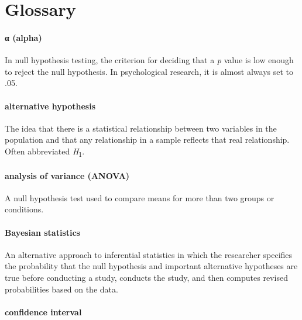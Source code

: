 \documentclass[
]{krantz}
\begin{document}
\hypertarget{glossary-13}{%
\section{Glossary}\label{glossary-13}}

\hypertarget{ux3b1-alpha}{%
\paragraph*{α (alpha)}\label{ux3b1-alpha}}

In null hypothesis testing, the criterion for deciding that a \emph{p} value is low enough to reject the null hypothesis. In psychological research, it is almost always set to .05.

\hypertarget{alternative-hypothesis}{%
\paragraph*{alternative hypothesis}\label{alternative-hypothesis}}

The idea that there is a statistical relationship between two variables in the population and that any relationship in a sample reflects that real relationship. Often abbreviated \emph{H}\textsubscript{1}.

\hypertarget{analysis-of-variance-anova}{%
\paragraph*{analysis of variance (ANOVA)}\label{analysis-of-variance-anova}}

A null hypothesis test used to compare means for more than two groups or conditions.

\hypertarget{bayesian-statistics}{%
\paragraph*{Bayesian statistics}\label{bayesian-statistics}}

An alternative approach to inferential statistics in which the researcher specifies the probability that the null hypothesis and important alternative hypotheses are true before conducting a study, conducts the study, and then computes revised probabilities based on the data.

\hypertarget{confidence-interval}{%
\paragraph*{confidence interval}\label{confidence-interval}}
\end{document}
